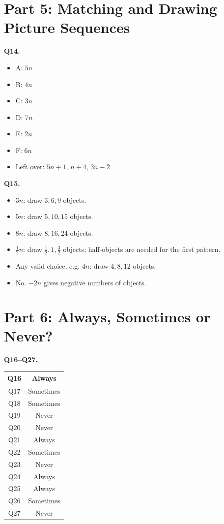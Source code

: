\documentclass[11pt,a4paper]{article}
\begin{document}
\section*{Part 5: Matching and Drawing Picture Sequences}

\textbf{Q14.}
\begin{itemize}
\item A: \(5n\)
\item B: \(4n\)
\item C: \(3n\)
\item D: \(7n\)
\item E: \(2n\)
\item F: \(6n\)
\item Left over: \(5n+1\), \(n+4\), \(3n-2\)
\end{itemize}

\textbf{Q15.}
\begin{itemize}
\item[(a)] \(3n\): draw \(3,6,9\) objects.
\item[(b)] \(5n\): draw \(5,10,15\) objects.
\item[(c)] \(8n\): draw \(8,16,24\) objects.
\item[(d)] \(\frac12 n\): draw \(\frac12,1,\frac32\) objects; half-objects are needed for the first pattern.
\item[(e)] Any valid choice, e.g. \(4n\): draw \(4,8,12\) objects.
\item[(f)] No. \(-2n\) gives negative numbers of objects.
\end{itemize}

\section*{Part 6: Always, Sometimes or Never?}

\textbf{Q16--Q27.}
\begin{center}
\begin{tabular}{|c|c|}
\hline
Q16 & Always\\
\hline
Q17 & Sometimes\\
\hline
Q18 & Sometimes\\
\hline
Q19 & Never\\
\hline
Q20 & Never\\
\hline
Q21 & Always\\
\hline
Q22 & Sometimes\\
\hline
Q23 & Never\\
\hline
Q24 & Always\\
\hline
Q25 & Always\\
\hline
Q26 & Sometimes\\
\hline
Q27 & Never\\
\hline
\end{tabular}
\end{center}
\end{document}
